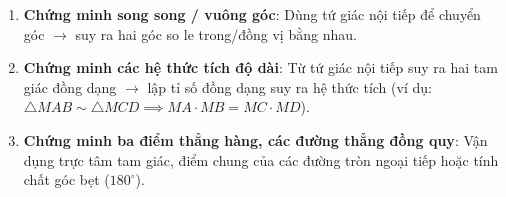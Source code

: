 \begin{enumerate}
\item \textbf{Chứng minh song song / vuông góc}: Dùng tứ giác nội tiếp để chuyển góc $\rightarrow$ suy ra hai góc so le trong/đồng vị bằng nhau.
\item \textbf{Chứng minh các hệ thức tích độ dài}: Từ tứ giác nội tiếp suy ra hai tam giác đồng dạng $\rightarrow$ lập tỉ số đồng dạng suy ra hệ thức tích (ví dụ: $\triangle MAB \sim \triangle MCD \implies MA \cdot MB = MC \cdot MD$).
\item \textbf{Chứng minh ba điểm thẳng hàng, các đường thẳng đồng quy}: Vận dụng trực tâm tam giác, điểm chung của các đường tròn ngoại tiếp hoặc tính chất góc bẹt ($180^\circ$).
\end{enumerate}
